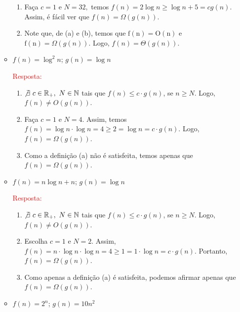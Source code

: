 \documentclass{article}
\begin{document}
\begin{enumerate}[label=\Alph*]
\begin{itemize}
\begin{enumerate}[itemsep=0cm, label=(\alph*)]
          \item Faça $c=1$ e $N=32,$ temos $f(n)=2 \log n \geq \log n+5=c g(n)$. Assim, é fácil ver que $f(n)=\Omega(g(n))$.
          
          \item Note que, de (a) e (b), temos que $\mathrm{f}(\mathrm{n})=\mathrm{O}(\mathrm{n})$ e $\mathrm{f}(\mathrm{n})=\Omega(g(n))$. Logo, $f(n)=\Theta(g(n))$.
      \end{enumerate}
      
      \item $f(n) = \log^2 n$; $g(n) = \log n$
      
      \textcolor{red}{Resposta: } 
      
      \begin{enumerate}[itemsep=0cm, label=(\alph*)]
          \item $\not \exists~c \in \mathbb{R}_+,~N \in \mathbb{N}$ tais que $f(n) \leq c\cdot g(n)$, se $n \geq N$. Logo, $f(n)\not =O(g(n))$.
          
          \item Faça $c=1$ e  $N=4$. Assim, temos $f(n)=\log n \cdot \log n=4 \geq 2=\log n=c \cdot g(n)$. Logo, $f(n)=\Omega(g(n))$.
          
          \item Como a definição (a) não é satisfeita, temos apenas que $f(n)=\Omega(g(n))$. 
      \end{enumerate}
      
      
      \item $f(n) = n\log n + n$; $g(n) = \log n$
      
      \textcolor{red}{Resposta: } 
      
      \begin{enumerate}[itemsep=0cm, label=(\alph*)]
          \item $\not \exists~c \in \mathbb{R}_+,~N \in \mathbb{N}$ tais que $f(n) \leq c\cdot g(n)$, se $n \geq N$. Logo, $f(n)\not =O(g(n))$.
          
          \item Escolha $c=1$ e $N=2$. Assim, $f(n)=n \cdot \log n \cdot \log n=4 \geq 1 =1 \cdot \log n=c \cdot g(n)$. Portanto, $f(n)=\Omega(g(n))$.
          
          \item Como apenas a definição (a) é satisfeita, podemos afirmar apenas que $f(n)=\Omega(g(n))$. 
      \end{enumerate}

      \item $f(n) = 2^n$; $g(n) = 10n^2$
      

\end{itemize}
\end{enumerate}
\end{document}
